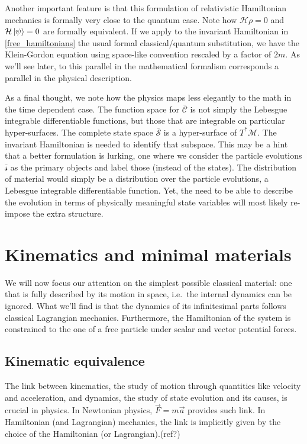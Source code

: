 \documentclass[aps,pra,10pt,twocolumn,floatfix,nofootinbib]{revtex4-1}
\numberwithin{equation}{section}
\theoremstyle{definition}
\begin{document}
Another important feature is that this formulation of relativistic Hamiltonian mechanics is formally very close to the quantum case. Note how $\mathcal{H} \rho = 0$ and $\mathcal{H} \ket{\psi} = 0$ are formally equivalent. If we apply to the invariant Hamiltonian in \ref{free_hamiltonians} the usual formal classical/quantum substitution, we have the Klein-Gordon equation using space-like convention rescaled by a factor of $2m$. As we'll see later, to this parallel in the mathematical formalism corresponds a parallel in the physical description.

As a final thought, we note how the physics maps less elegantly to the math in the time dependent case. The function space for $\bar{\mathcal{C}}$ is not simply the Lebesgue integrable differentiable functions, but those that are integrable on particular hyper-surfaces. The complete state space $\bar{\mathcal{S}}$ is a hyper-surface of $T^*\mathcal{M}$. The invariant Hamiltonian is needed to identify that subspace. This may be a hint that a better formulation is lurking, one where we consider the particle evolutions $\bar{\mathcal{s}}$ as the primary objects and label those (instead of the states). The distribution of material would simply be a distribution over the particle evolutions, a Lebesgue integrable differentiable function. Yet, the need to be able to describe the evolution in terms of physically meaningful state variables will most likely re-impose the extra structure.

\section{Kinematics and minimal materials}
\label{sec:Lagrangian}

We will now focus our attention on the simplest possible classical material: one that is fully described by its motion in space, i.e.~the internal dynamics can be ignored. What we'll find is that the dynamics of its infinitesimal parts follows classical Lagrangian mechanics. Furthermore, the Hamiltonian of the system is constrained to the one of a free particle under scalar and vector potential forces.

\subsection{Kinematic equivalence}

The link between kinematics, the study of motion through quantities like velocity and acceleration, and dynamics, the study of state evolution and its causes, is crucial in physics. In Newtonian physics, $\vec{F}=m\vec{a}$ provides such link. In Hamiltonian (and Lagrangian) mechanics, the link is implicitly given by the choice of the Hamiltonian (or Lagrangian).(ref?)
\end{document}
